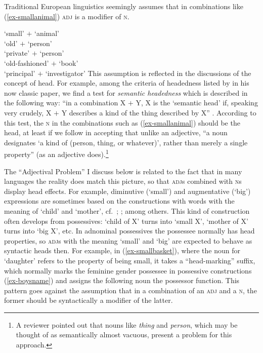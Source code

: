 \documentclass[output=paper,nobabel,draftmode  ,colorlinks, citecolor=brown]{langscibook}
\begin{document}
Traditional European linguistics seemingly assumes that in combinations like (\ref{ex-smallanimal}) \textsc{adj} is a modifier of \textsc{n}.

\eal\label{ex-smallanimal}
\ex `small' $+$ `animal' \\ 
\ex `old' $+$ `person'\\
\ex `private' $+$ `person' \\ 
\ex `old-fashioned' $+$ `book'\\
\ex `principal' $+$ `investigator'
\zl
This assumption is reflected in the discussions of the concept of head. For example, among the
criteria of headedness listed by \citet{Zwicky85a} in his now classic paper, we find a test for
\emph{semantic headedness} which is described in the following way: ``in a combination X $+$ Y, X is
the `semantic head' if, speaking very crudely, X $+$ Y describes a kind of the thing described by X''
\citep[4]{Zwicky85a}. According to this test, the \textsc{n} in the combinations such as
(\ref{ex-smallanimal}) should be the head, at least if we follow \citet*[359]{Wierzbicka1986} in
accepting that unlike an adjective, ``a noun designates `a kind of (person, thing, or whatever)',
rather than merely a single property'' (as an adjective does).\footnote{A reviewer pointed out that
  nouns like \emph{thing} and \emph{person}, which may be thought of as semantically almost vacuous, present a
  problem for this approach.} 

The ``Adjectival Problem'' I discuss below is related to the fact that
in many languages the reality does match this picture, so that \textsc{adj}s combined with
\textsc{n}s display head effects. For example, diminutive (`small') and augmentative (`big')
expressions are sometimes based on the constructions with words with the meaning of `child’ and
`mother’, cf.\ \citet{Matisoff1992}; \citet{Jurafsky1996}; \citet*[65--67]{HeineKuteva2002} among
others. This kind of construction often develops from possessives: `child of X' turns into `small
X', `mother of X' turns into `big X', etc. In adnominal possessives the possessee normally has head
properties, so \textsc{adj}s with the meaning `small' and `big' are expected to behave as syntactic
heads then. For example, in (\ref{ex-smallbasket}), where the noun for `daughter' refers to the
property of being small, it takes a ``head-marking'' suffix, which normally marks the feminine
gender possessee in possessive constructions (\ref{ex-boysname}) and assigns the following noun the
possessor function. This pattern goes against the assumption that in a combination of an
\textsc{adj} and a \textsc{n}, the former should be syntactically a modifier of the latter. 
\end{document}

